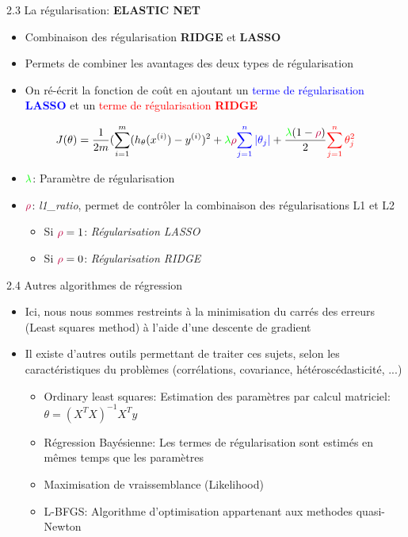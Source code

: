 \begin{frame}{2.3 La régularisation: \textbf{ELASTIC NET}}
  \begin{itemize}
  \item Combinaison des régularisation \textbf{RIDGE} et \textbf{LASSO}
  \item Permets de combiner les avantages des deux types de régularisation
  \item On ré-écrit la fonction de coût en ajoutant un \textcolor{blue}{terme de régularisation \textbf{LASSO}} et un \textcolor{red}{terme de régularisation \textbf{RIDGE}}
  \end{itemize}
  \begin{equation*}
    J(\theta) = \frac{1}{2m}(\displaystyle\sum_{i=1}^{m}(h_{\theta}(x^{(i)}) - y^{(i)})^{2} + \textcolor{green}{\lambda}\textcolor{purple}{\rho}\textcolor{blue}{\displaystyle\sum_{j=1}^{n}|\theta_{j}|} + \frac{\textcolor{green}{\lambda}(1 - \textcolor{purple}{\rho})}{2}\textcolor{red}{\displaystyle\sum_{j=1}^{n}\theta_{j}^{2}}
  \end{equation*}
  \begin{itemize}
  \item $\textcolor{green}{\lambda}$: Paramètre de régularisation
  \item $\textcolor{purple}{\rho}$: \textit{l1\_ratio}, permet de contrôler la combinaison des régularisations L1 et L2
    \begin{itemize}
    \item Si $\textcolor{purple}{\rho} = 1$: \textit{Régularisation LASSO}
    \item Si $\textcolor{purple}{\rho} = 0$: \textit{Régularisation RIDGE}
    \end{itemize}
  \end{itemize}
\end{frame}

\begin{frame}{2.4 Autres algorithmes de régression}
  \begin{itemize}
  \item Ici, nous nous sommes restreints à la minimisation du carrés des erreurs (Least squares method) à l'aide d'une descente de gradient
  \item Il existe d'autres outils permettant de traiter ces sujets, selon les caractéristiques du problèmes (corrélations, covariance, hétéroscédasticité, ...)
    \begin{itemize}
    \item Ordinary least squares: Estimation des paramètres par calcul matriciel: $\theta = (X^{T}X)^{-1}X^{T}y$
    \item Régression Bayésienne: Les termes de régularisation sont estimés en mêmes temps que les paramètres
    \item Maximisation de vraissemblance (Likelihood)
    \item L-BFGS: Algorithme d'optimisation appartenant aux methodes quasi-Newton
    \end{itemize}
  \end{itemize}
\end{frame}

